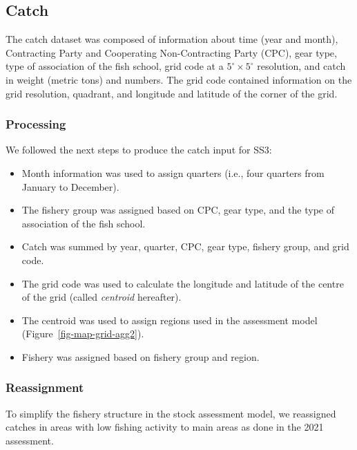 \documentclass[
]{scrartcl}
\providecommand{\tightlist}{%
  \setlength{\itemsep}{0pt}\setlength{\parskip}{0pt}}\usepackage{longtable,booktabs,array}
\begin{document}
\subsection{Catch}\label{catch}

The catch dataset was composed of information about time (year and
month), Contracting Party and Cooperating Non-Contracting Party (CPC),
gear type, type of association of the fish school, grid code at a
\(5^\circ\times 5^\circ\) resolution, and catch in weight (metric tons)
and numbers. The grid code contained information on the grid resolution,
quadrant, and longitude and latitude of the corner of the grid.

\subsubsection{Processing}\label{processing}

We followed the next steps to produce the catch input for SS3:

\begin{itemize}
\tightlist
\item
  Month information was used to assign quarters (i.e., four quarters
  from January to December).
\item
  The fishery group was assigned based on CPC, gear type, and the type
  of association of the fish school.
\item
  Catch was summed by year, quarter, CPC, gear type, fishery group, and
  grid code.
\item
  The grid code was used to calculate the longitude and latitude of the
  centre of the grid (called \emph{centroid} hereafter).
\item
  The centroid was used to assign regions used in the assessment model
  (Figure~\ref{fig-map-grid-agg2}).
\item
  Fishery was assigned based on fishery group and region.
\end{itemize}

\subsubsection{Reassignment}\label{sec-catchreassign}

To simplify the fishery structure in the stock assessment model, we
reassigned catches in areas with low fishing activity to main areas as
done in the 2021 assessment.
\end{document}
